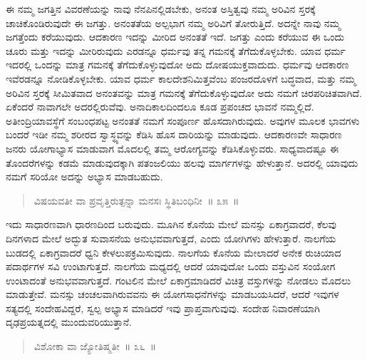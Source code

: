 ಈ ನಮ್ಮ ಜಗತ್ತಿನ ವಿವರಣೆಯನ್ನು ನಾವು ನೆನಪಿನಲ್ಲಿಡಬೇಕು, ಅನಂತ ಅಸ್ತಿತ್ವವು ನಮ್ಮ ಅರಿವಿನ ಸ್ತರಕ್ಕೆ ಚಾಚಿಕೊಂಡಿರುವುದೇ ಈ ಜಗತ್ತು. ಅನಂತತೆಯ ಅಲ್ಪಭಾಗ ನಮ್ಮ ಅರಿವಿಗೆ ತೋರುತ್ತಿದೆ. ಅದನ್ನೇ ನಾವು ನಮ್ಮ ಜಗತ್ತೆಂದು ಕರೆಯುವುದು. ಆದಕಾರಣ ಇದನ್ನು ಮೀರಿದ ಅನಂತತೆ ಇದೆ. ಜಗತ್ತು ಎಂದು ಕರೆಯುವ ಈ ಒಂದು ಚೂರು ಮತ್ತು ಇದನ್ನು ಮೀರಿರುವುದು ಎರಡನ್ನೂ ಧರ್ಮವು ತನ್ನ ಗಮನಕ್ಕೆ ತೆಗೆದುಕೊಳ್ಳಬೇಕು. ಯಾವ ಧರ್ಮ ಇದರಲ್ಲಿ ಒಂದನ್ನು ಮಾತ್ರ ಗಮನಕ್ಕೆ ತೆಗೆದುಕೊಳ್ಳುವುದೋ ಅದು ದೋಷಯುಕ್ತವಾದುದು. ಧರ್ಮವು ಆದಕಾರಣ ಇವೆರಡನ್ನೂ ನೋಡಿಕೊಳ್ಳಬೇಕು. ಯಾವ ಧರ್ಮ ಕಾಲದೇಶನಿಮಿತ್ತವೆಂಬ ಪಂಜರದೊಳಗೆ ಬದ್ಧವಾದ, ಮತ್ತು ನಮ್ಮ ಅರಿವಿನ ಸ್ತರಕ್ಕೆ ಸೀಮಿತವಾದ ಅನಂತವನ್ನು ಮಾತ್ರ ಗಮನಕ್ಕೆ ತೆಗೆದುಕೊಳ್ಳುವುದೋ ಅದು ನಮಗೆ ಚಿರಪರಿಚಿತವಾಗಿದೆ. ಏಕೆಂದರೆ ನಾವಾಗಲೇ ಅದರಲ್ಲಿರುವೆವು. ಅನಾದಿಕಾಲದಿಂದಲೂ ಕೂಡ ಪ್ರಪಂಚದ ಭಾವನೆ ನಮ್ಮಲ್ಲಿದೆ. ಅತೀಂದ್ರಿಯಾವಸ್ಥೆಗೆ ಸಂಬಂಧಪಟ್ಟ ಅನಂತತೆ ನಮಗೆ ಸಂಪೂರ್ಣ ಹೊಸದಾಗಿರುವುದು. ಅವುಗಳ ಮೂಲಕ ಭಾವಗಳು ಬಂದರೆ ಇಡೀ ನಮ್ಮ ಶರೀರದ ಸ್ವಾಸ್ಥ್ಯವನ್ನು ಕೆಡಿಸಿ ಹೊಸ ದಾರಿಯನ್ನು ಮಾಡುವುದು. ಆದಕಾರಣವೇ ಸಾಧಾರಣ ಜನರು ಯೋಗಾಭ್ಯಾಸ ಮಾಡುವಾಗ ಮೊದಲಲ್ಲಿ ತಮ್ಮ ಆರೋಗ್ಯವನ್ನು ಕೆಡಿಸಿಕೊಳ್ಳುವರು. ಸಾಧ್ಯವಾದಷ್ಟೂ ಈ ತೊಂದರೆಗಳನ್ನು ಕಡಮೆ ಮಾಡುವುದಕ್ಕಾಗಿ ಪತಂಜಲಿಯು ಹಲವು ಮಾರ್ಗಗಳನ್ನು ಹೇಳುತ್ತಾನೆ. ಅದರಲ್ಲಿ ಯಾವುದು ನಮಗೆ ಸರಿಯೋ ಅದನ್ನು ಅಭ್ಯಾಸ ಮಾಡಬಹುದು. 


\begin{verse}
ವಿಷಯವತೀ ವಾ ಪ್ರವೃತ್ತಿರುತ್ಪನ್ನಾ ಮನಸಃ ಸ್ಥಿತಿಬಂಧಿನೀ~॥ ೩೫~॥
\end{verse}

\vspace{-0.28cm}


ಇದು ಸಾಧಾರಣವಾಗಿ ಧಾರಣದಿಂದ ಬರುವುದು. ಮೂಗಿನ ಕೊನೆಯ ಮೇಲೆ ಮನಸ್ಸು ಏಕಾಗ್ರವಾದರೆ, ಕೆಲವು ದಿನಗಳಾದ ಮೇಲೆ ಅದ್ಭುತ ಸುವಾಸನೆಯ ಅನುಭವವಾಗುತ್ತದೆ, ಎಂದು ಯೋಗಿಗಳು ಹೇಳುತ್ತಾರೆ. ನಾಲಗೆಯ ಬುಡದಲ್ಲಿ ಏಕಾಗ್ರವಾದರೆ ಧ್ವನಿ ಕೇಳಲುಪಕ್ರಮಿಸುವುದು. ನಾಲಗೆಯ ಕೊನೆಯ ಮೇಲಾದರೆ ಅನೇಕ ರುಚಿಯಾದ ಪದಾರ್ಥಗಳ ಸವಿ ಉಂಟಾಗುತ್ತದೆ. ನಾಲಗೆಯ ಮಧ್ಯದಲ್ಲಿ ಆದರೆ ಯಾವುದೋ ಒಂದು ವಸ್ತುವಿನ ಸಂಯೋಗ ಉಂಟಾದಂತೆ ಅನುಭವವಾಗುತ್ತದೆ. ಗಂಟಲಿನ ಮೇಲೆ ಏಕಾಗ್ರಮಾಡಿದರೆ ವಿಚಿತ್ರ ವಸ್ತುಗಳನ್ನು ನೋಡಲು ಮೊದಲು ಮಾಡುತ್ತೇವೆ. ಮನಸ್ಸು ಚಂಚಲವಾಗಿರುವವನು ಈ ಯೋಗಸಾಧನೆಗಳನ್ನು ಮಾಡಬಯಸಿದರೆ, ಆದರೆ ಇವುಗಳ ಸತ್ಯದಲ್ಲಿ ಸಂದೇಹವಿದ್ದರೆ, ಸ್ವಲ್ಪ ಅಭ್ಯಾಸ ಮಾಡಿದರೆ ಇವು ಪ್ರಾಪ್ತವಾಗುವುವು. ಸಂದೇಹ ನಿವಾರಣೆಯಾಗಿ ದೃಢಪ್ರಯತ್ನದಲ್ಲಿ ಮುಂದುವರಿಯುತ್ತಾನೆ. 

\vspace{-0.25cm}

\begin{verse}
ವಿಶೋಕಾ ವಾ ಜ್ಯೋತಿಷ್ಮತೀ~॥ ೩೬~॥
\end{verse}

\vspace{-0.3cm}

